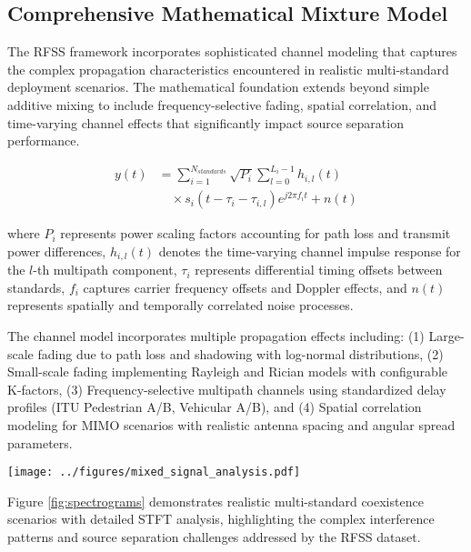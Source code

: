 \documentclass[twocolumn]{article}
\begin{document}
\subsection{Comprehensive Mathematical Mixture Model}

The RFSS framework incorporates sophisticated channel modeling that captures the complex propagation characteristics encountered in realistic multi-standard deployment scenarios. The mathematical foundation extends beyond simple additive mixing to include frequency-selective fading, spatial correlation, and time-varying channel effects that significantly impact source separation performance.

\begin{align}
y(t) &= \sum_{i=1}^{N_{standards}} \sqrt{P_i} \sum_{l=0}^{L_i-1} h_{i,l}(t) \nonumber \\
&\quad \times s_i(t-\tau_i-\tau_{i,l}) e^{j2\pi f_i t} + n(t)
\end{align}

where $P_i$ represents power scaling factors accounting for path loss and transmit power differences, $h_{i,l}(t)$ denotes the time-varying channel impulse response for the $l$-th multipath component, $\tau_i$ represents differential timing offsets between standards, $f_i$ captures carrier frequency offsets and Doppler effects, and $n(t)$ represents spatially and temporally correlated noise processes.

The channel model incorporates multiple propagation effects including: (1) Large-scale fading due to path loss and shadowing with log-normal distributions, (2) Small-scale fading implementing Rayleigh and Rician models with configurable K-factors, (3) Frequency-selective multipath channels using standardized delay profiles (ITU Pedestrian A/B, Vehicular A/B), and (4) Spatial correlation modeling for MIMO scenarios with realistic antenna spacing and angular spread parameters.

\begin{figure*}[t]
\centering
\texttt{[image: ../figures/mixed\_signal\_analysis.pdf]}
\caption{Multi-standard signal coexistence analysis showing individual GSM, LTE, and 5G NR signals alongside their complex mixed combination. The spectrograms demonstrate realistic interference scenarios and highlight the source separation challenges addressed by the RFSS dataset.}
\label{fig:spectrograms}
\end{figure*}

Figure \ref{fig:spectrograms} demonstrates realistic multi-standard coexistence scenarios with detailed STFT analysis, highlighting the complex interference patterns and source separation challenges addressed by the RFSS dataset.
\end{document}
